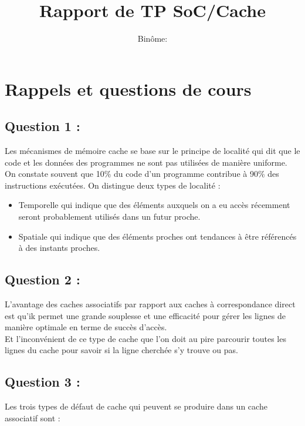 \documentclass[11pt,a4paper]{article}
\begin{document}
\title{Rapport de TP SoC/Cache}
\author{Binôme:}
\maketitle
\section{Rappels et questions de cours}
    \subsection{Question 1 :}
Les mécanismes de mémoire cache se base sur le principe de localité qui dit que le code et les données des programmes ne sont pas utilisées de manière uniforme. On constate souvent que 10\% du code d'un programme contribue à 90\% des instructions exécutées. On distingue deux types de localité : \\

\begin{itemize}
    \item Temporelle qui indique que des éléments auxquels on a eu accès récemment seront probablement utilisés dans un futur proche.
    \item Spatiale qui indique que des éléments proches ont tendances à être référencés à des instants proches.
\end{itemize}

    \subsection{Question 2 :}
    
L'avantage des caches associatifs par rapport aux caches à correspondance direct est qu'ik permet une grande souplesse et une efficacité pour gérer les lignes de manière optimale en terme de succès d’accès. \\

Et l'inconvénient de ce type de cache que l'on doit au pire parcourir toutes les lignes du cache pour savoir si la
ligne cherchée s’y trouve ou pas.
    
    \subsection{Question 3 :}
    
Les trois types de défaut de cache qui peuvent se produire dans un cache associatif sont : \\
\end{document}
